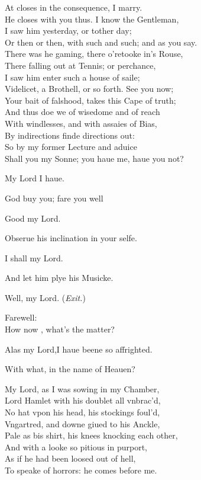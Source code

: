 \documentclass[a5paper,DIV=calc,11pt]{scrbook}
\begin{document}
\begin{drama*}
    \polspeaks At closes in the consequence, I marry.\\
    He closes with you thus. I know the Gentleman,\\
    I saw him yesterday, or tother day;\\
    Or then or then, with such and such; and as you say.\\
    There was he gaming, there o'retooke in's Rouse,\\
    There falling out at Tennis; or perchance,\\
    I saw him enter such a house of saile;\\
    Videlicet, a Brothell, or so forth. See you now;\\
    Your bait of falshood, takes this Cape of truth;\\
    And thus doe we of wisedome and of reach\\
    With windlesses, and with assaies of Bias,\\
    By indirections finde directions out:\\
    So by my former Lecture and aduice\\
    Shall you my Sonne; you haue me, haue you not?
    
    \reynspeaks My Lord I haue.
    
    \polspeaks God buy you; fare you well
    
    \reynspeaks Good my Lord.
    
    \polspeaks Obserue his inclination in your selfe.
    
    \reynspeaks I shall my Lord.
    
    \polspeaks And let him plye his Musicke.
    
    \reynspeaks Well, my Lord. \hfill(\textit{Exit.})
    
    
    \polspeaks Farewell:\\
    How now \ophe, what's the matter?
    
    \ophespeaks Alas my Lord,I haue beene so affrighted.
    
    \polspeaks With what, in the name of Heauen?
    
    \ophespeaks My Lord, as I was sowing in my Chamber,\\
    Lord Hamlet with his doublet all vnbrac'd,\\
    No hat vpon his head, his stockings foul'd,\\
    Vngartred, and downe giued to his Anckle,\\
    Pale as bis shirt, his knees knocking each other,\\
    And with a looke so pitious in purport,\\
    As if he had been loosed out of hell,\\
    To speake of horrors: he comes before me.
    

\end{drama*}
\end{document}
